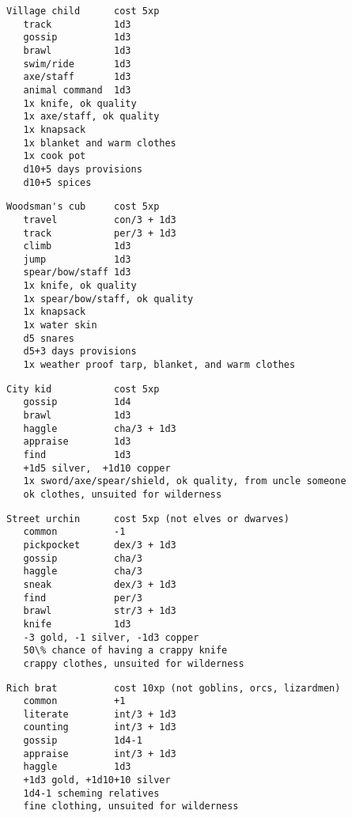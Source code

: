 \small\begin{samepage}\begin{verbatim}
Village child      cost 5xp
   track           1d3
   gossip          1d3
   brawl           1d3
   swim/ride       1d3
   axe/staff       1d3
   animal command  1d3
   1x knife, ok quality
   1x axe/staff, ok quality
   1x knapsack
   1x blanket and warm clothes
   1x cook pot
   d10+5 days provisions
   d10+5 spices
\end{verbatim}\end{samepage}\normalsize
\pagebreak[1]
\small\begin{samepage}\begin{verbatim}
Woodsman's cub     cost 5xp
   travel          con/3 + 1d3
   track           per/3 + 1d3
   climb           1d3
   jump            1d3
   spear/bow/staff 1d3
   1x knife, ok quality
   1x spear/bow/staff, ok quality
   1x knapsack
   1x water skin
   d5 snares
   d5+3 days provisions
   1x weather proof tarp, blanket, and warm clothes
\end{verbatim}\end{samepage}\normalsize
\pagebreak[1]
\small\begin{samepage}\begin{verbatim}
City kid           cost 5xp
   gossip          1d4
   brawl           1d3
   haggle          cha/3 + 1d3
   appraise        1d3
   find            1d3
   +1d5 silver,  +1d10 copper
   1x sword/axe/spear/shield, ok quality, from uncle someone
   ok clothes, unsuited for wilderness
\end{verbatim}\end{samepage}\normalsize
\pagebreak[1]
\small\begin{samepage}\begin{verbatim}
Street urchin      cost 5xp (not elves or dwarves)
   common          -1
   pickpocket      dex/3 + 1d3
   gossip          cha/3
   haggle          cha/3
   sneak           dex/3 + 1d3
   find            per/3
   brawl           str/3 + 1d3
   knife           1d3
   -3 gold, -1 silver, -1d3 copper
   50\% chance of having a crappy knife
   crappy clothes, unsuited for wilderness
\end{verbatim}\end{samepage}\normalsize
\pagebreak[1]
\small\begin{samepage}\begin{verbatim}
Rich brat          cost 10xp (not goblins, orcs, lizardmen)
   common          +1
   literate        int/3 + 1d3
   counting        int/3 + 1d3
   gossip          1d4-1
   appraise        int/3 + 1d3
   haggle          1d3
   +1d3 gold, +1d10+10 silver
   1d4-1 scheming relatives
   fine clothing, unsuited for wilderness
\end{verbatim}\end{samepage}\normalsize
